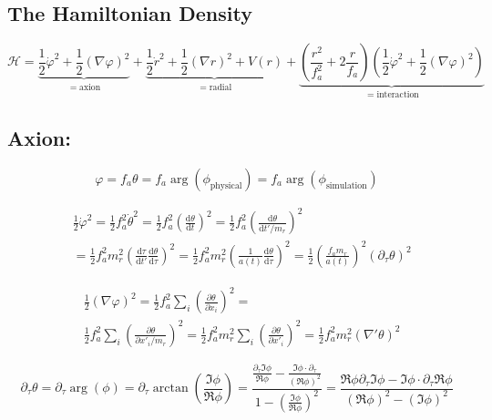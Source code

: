 \documentclass[a4paper]{article}
\begin{document}
\subsection{The Hamiltonian Density}
\begin{equation}
    \mathcal{H} =
    \underbrace{\frac{1}{2} \dot{\varphi}^2 + \frac{1}{2} (\nabla \varphi)^2}_{= \mathrm{axion}} +
    \underbrace{\frac{1}{2} \dot{r}^2 + \frac{1}{2} (\nabla r)^2 + V(r)}_{= \mathrm{radial}} +
    \underbrace{\left( \frac{r^2}{f_a^2} + 2 \frac{r}{f_a} \right) \left( \frac{1}{2} \dot{\varphi}^2 + \frac{1}{2} (\nabla \varphi)^2 \right)}_{= \mathrm{interaction}}
\end{equation}

\subsection{Axion:}

\begin{equation}
    \varphi = f_a \theta = f_a \arg(\phi_\mathrm{physical}) = f_a \arg(\phi_\mathrm{simulation})
\end{equation}

\begin{align}
    &\frac{1}{2} \dot{\varphi}^2 = \frac{1}{2} f_a^2 \dot{\theta}^2
    = \frac{1}{2} f_a^2 \left( \frac{\mathrm{d} \theta}{\mathrm{d} t} \right)^2
    = \frac{1}{2} f_a^2 \left( \frac{\mathrm{d} \theta}{\mathrm{d} t' / m_r} \right)^2 \\
    &= \frac{1}{2} f_a^2 m_r^2 \left( \frac{\mathrm{d} \tau}{\mathrm{d} t'} \frac{\mathrm{d} \theta}{\mathrm{d} \tau} \right)^2
    = \frac{1}{2} f_a^2 m_r^2 \left( \frac{1}{a(t)} \frac{\mathrm{d} \theta}{\mathrm{d} \tau} \right)^2
    = \frac{1}{2} \left( \frac{f_a m_r}{a(t)} \right)^2 \left( \partial_\tau \theta \right)^2
\end{align}

\begin{align}
 &\frac{1}{2} (\nabla \varphi)^2 =
 \frac{1}{2} f_a^2 \sum_i \left(\frac{\partial \theta}{\partial x_i}\right)^2 = \\
 &\frac{1}{2} f_a^2 \sum_i \left(\frac{\partial \theta}{\partial x'_i / m_r}\right)^2 =
 \frac{1}{2} f_a^2 m_r^2 \sum_i \left(\frac{\partial \theta}{\partial x'_i}\right)^2 =
 \frac{1}{2} f_a^2 m_r^2 (\nabla' \theta)^2
\end{align}

\begin{equation}
    \partial_\tau \theta = \partial_\tau \arg(\phi) = \partial_\tau \arctan \left( \frac{ \Im \phi }{ \Re \phi } \right)
    = \frac{ \frac{ \partial_\tau \Im \phi }{ \Re \phi } - \frac{ \Im \phi \cdot \partial_\tau}{(\Re \phi)^2}}{ 1 - \left( \frac{\Im \phi}{\Re \phi} \right)^2}
    = \frac{ \Re \phi \partial_\tau \Im \phi - \Im \phi \cdot \partial_\tau \Re \phi}{ (\Re \phi)^2 - (\Im \phi)^2}
\end{equation}
\end{document}
